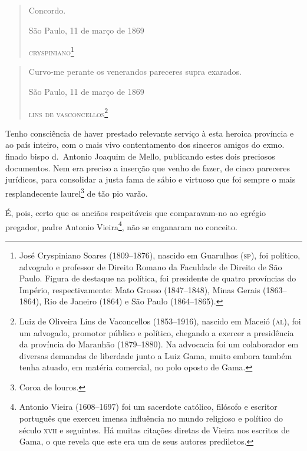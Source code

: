 \begin{quote}
Concordo.

\begin{flushright}
São Paulo, 11 de março de 1869

\textsc{cryspiniano}\footnote{José Cryspiniano Soares (1809--1876),
  nascido em Guarulhos (\textsc{sp}), foi político, advogado e professor de
  Direito Romano da Faculdade de Direito de São Paulo. Figura de
  destaque na política, foi presidente de quatro províncias do Império,
  respectivamente: Mato Grosso (1847--1848), Minas Gerais (1863--1864),
  Rio de Janeiro (1864) e São Paulo (1864--1865).}
\end{flushright}
\end{quote}  

\begin{quote}
Curvo-me perante os venerandos pareceres supra exarados.

\begin{flushright}
São Paulo, 11 de março de 1869

\textsc{lins de vasconcellos}\footnote{Luiz de Oliveira Lins de
  Vaconcellos (1853--1916), nascido em Maceió (\textsc{al}), foi um advogado,
  promotor público e político, chegando a exercer a presidência da
  província do Maranhão (1879--1880). Na advocacia foi um colaborador em
  diversas demandas de liberdade junto a Luiz Gama, muito embora também
  tenha atuado, em matéria comercial, no polo oposto de Gama.}
\end{flushright}
\end{quote}

Tenho consciência de haver prestado relevante serviço à esta heroica
província e ao país inteiro, com o mais vivo contentamento dos sinceros
amigos do exmo.\,finado bispo d.~Antonio Joaquim de Mello, publicando
estes dois preciosos documentos. Nem era preciso a inserção que venho de
fazer, de cinco pareceres jurídicos, para consolidar a justa fama de
sábio e virtuoso que foi sempre o mais resplandecente laurel\footnote{
  Coroa de louros.} de tão pio varão.

É, pois, certo que os anciãos respeitáveis que comparavam-no ao egrégio
pregador, padre Antonio Vieira\footnote{Antonio Vieira (1608--1697) foi
  um sacerdote católico, filósofo e escritor português que exerceu
  imensa influência no mundo religioso e político do século \textsc{xvii} e
  seguintes. Há muitas citações diretas de Vieira nos escritos de Gama,
  o que revela que este era um de seus autores prediletos.}, não se
enganaram no conceito.

